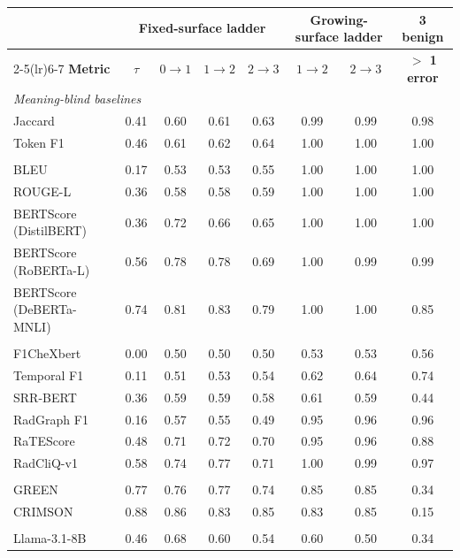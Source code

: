 \begin{tabular}{lccccccc}
\toprule
 & \multicolumn{4}{c}{\textbf{Fixed-surface ladder}} & \multicolumn{2}{c}{\textbf{Growing-surface ladder}} & \textbf{3 benign} \\
\cmidrule(lr){2-5}\cmidrule(lr){6-7}
\textbf{Metric} & $\tau$ & $0{\to}1$ & $1{\to}2$ & $2{\to}3$ & $1{\to}2$ & $2{\to}3$ & \textbf{$>$ 1 error} \\
\midrule
\multicolumn{8}{l}{\textit{Meaning-blind baselines}} \\
Jaccard & 0.41 & 0.60 & 0.61 & 0.63 & 0.99 & 0.99 & 0.98 \\
Token F1 & 0.46 & 0.61 & 0.62 & 0.64 & 1.00 & 1.00 & 1.00 \\
\addlinespace[2pt]
\multicolumn{8}{l}{\textit{Lexical / embedding}} \\
BLEU & 0.17 & 0.53 & 0.53 & 0.55 & 1.00 & 1.00 & 1.00 \\
ROUGE-L & 0.36 & 0.58 & 0.58 & 0.59 & 1.00 & 1.00 & 1.00 \\
BERTScore (DistilBERT) & 0.36 & 0.72 & 0.66 & 0.65 & 1.00 & 1.00 & 1.00 \\
BERTScore (RoBERTa-L) & 0.56 & 0.78 & 0.78 & 0.69 & 1.00 & 0.99 & 0.99 \\
BERTScore (DeBERTa-MNLI) & 0.74 & 0.81 & 0.83 & 0.79 & 1.00 & 1.00 & 0.85 \\
\addlinespace[2pt]
\multicolumn{8}{l}{\textit{Clinical, non-LLM}} \\
F1CheXbert & 0.00 & 0.50 & 0.50 & 0.50 & 0.53 & 0.53 & 0.56 \\
Temporal F1 & 0.11 & 0.51 & 0.53 & 0.54 & 0.62 & 0.64 & 0.74 \\
SRR-BERT & 0.36 & 0.59 & 0.59 & 0.58 & 0.61 & 0.59 & 0.44 \\
RadGraph F1 & 0.16 & 0.57 & 0.55 & 0.49 & 0.95 & 0.96 & 0.96 \\
RaTEScore & 0.48 & 0.71 & 0.72 & 0.70 & 0.95 & 0.96 & 0.88 \\
RadCliQ-v1 & 0.58 & 0.74 & 0.77 & 0.71 & 1.00 & 0.99 & 0.97 \\
\addlinespace[2pt]
\multicolumn{8}{l}{\textit{LLM-based metrics}} \\
GREEN & 0.77 & 0.76 & 0.77 & 0.74 & 0.85 & 0.85 & 0.34 \\
CRIMSON & 0.88 & 0.86 & 0.83 & 0.85 & 0.83 & 0.85 & 0.15 \\
\addlinespace[2pt]
\multicolumn{8}{l}{\textit{LLM judges (rubric prompt)}} \\
Llama-3.1-8B & 0.46 & 0.68 & 0.60 & 0.54 & 0.60 & 0.50 & 0.34 \\

\end{tabular}
